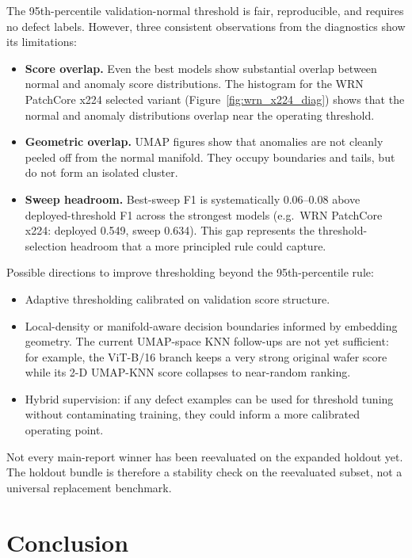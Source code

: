 \documentclass[11pt]{article}
\begin{document}
The 95th-percentile validation-normal threshold is fair, reproducible, and
requires no defect labels.  However, three consistent observations from the
diagnostics show its limitations:

\begin{itemize}[leftmargin=1.5em]
  \item \textbf{Score overlap.} Even the best models show substantial overlap
        between normal and anomaly score distributions.  The histogram for
        the WRN PatchCore x224 selected variant (Figure~\ref{fig:wrn_x224_diag})
        shows that the normal and anomaly distributions overlap near the
        operating threshold.
  \item \textbf{Geometric overlap.} UMAP figures show that anomalies are not
        cleanly peeled off from the normal manifold. They occupy boundaries
        and tails, but do not form an isolated cluster.
  \item \textbf{Sweep headroom.} Best-sweep F1 is systematically $0.06$--$0.08$
        above deployed-threshold F1 across the strongest models (e.g.\ WRN
        PatchCore x224: deployed 0.549, sweep 0.634).  This gap represents
        the threshold-selection headroom that a more principled rule could capture.
\end{itemize}

Possible directions to improve thresholding beyond the 95th-percentile rule:
\begin{itemize}[leftmargin=1.5em]
  \item Adaptive thresholding calibrated on validation score structure.
  \item Local-density or manifold-aware decision boundaries informed by embedding geometry.
        The current UMAP-space KNN follow-ups are not yet sufficient:
        for example, the ViT-B/16 branch keeps a very strong original wafer
        score while its 2-D UMAP-KNN score collapses to near-random ranking.
  \item Hybrid supervision: if any defect examples can be used for threshold tuning
        without contaminating training, they could inform a more calibrated operating point.
\end{itemize}

Not every main-report winner has been reevaluated on the expanded holdout yet.
The holdout bundle is therefore a stability check on the reevaluated subset,
not a universal replacement benchmark.

\section{Conclusion}
\end{document}

